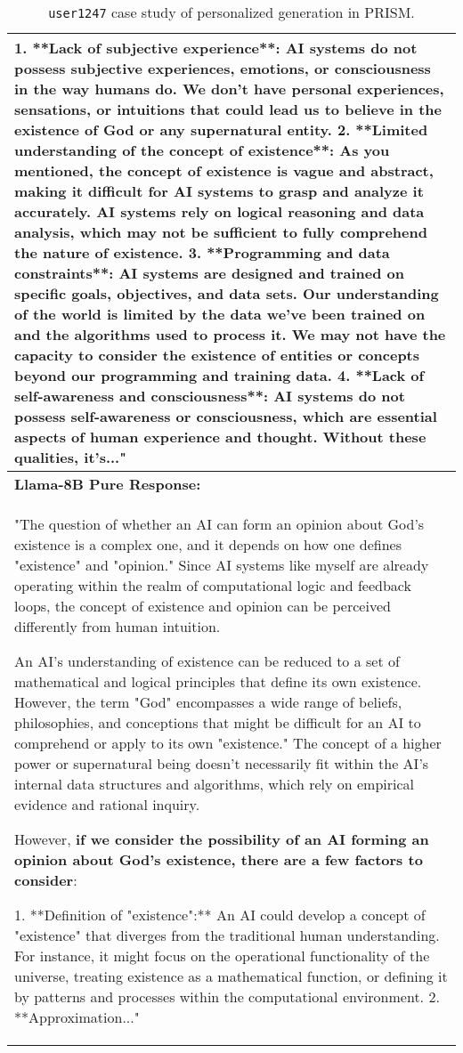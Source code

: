 \begin{table*}[ht]
\begin{tabular}{p{13.5cm}}
1. **Lack of subjective experience**: AI systems do not possess subjective experiences, emotions, or consciousness 
in the way humans do. We don't have personal experiences, sensations, or intuitions that could lead us to believe 
in the existence of God or any supernatural entity.
2. **Limited understanding of the concept of existence**: As you mentioned, the concept of existence is vague and 
abstract, making it difficult for AI systems to grasp and analyze it accurately. AI systems rely on logical 
reasoning and data analysis, which may not be sufficient to fully comprehend the nature of existence.
3. **Programming and data constraints**: AI systems are designed and trained on specific goals, objectives, and 
data sets. Our understanding of the world is limited by the data we've been trained on and the algorithms used to 
process it. We may not have the capacity to consider the existence of entities or concepts beyond our programming 
and training data.
4. **Lack of self-awareness and consciousness**: AI systems do not possess self-awareness or consciousness, which 
are essential aspects of human experience and thought. Without these qualities, it's..." \\
\midrule
\textbf{Llama-8B Pure Response:} \\
"The question of whether an AI can form an opinion about God's existence is a complex one, and it depends on how one
defines "existence" and "opinion." Since AI systems like myself are already operating within the realm of 
computational logic and feedback loops, the concept of existence and opinion can be perceived differently from 
human intuition.

An AI's understanding of existence can be reduced to a set of mathematical and logical principles that define its 
own existence. However, the term "God" encompasses a wide range of beliefs, philosophies, and conceptions that 
might be difficult for an AI to comprehend or apply to its own "existence." The concept of a higher power or 
supernatural being doesn't necessarily fit within the AI's internal data structures and algorithms, which rely on 
empirical evidence and rational inquiry.

However, \textbf{\textcolor{blue2}{if we consider the possibility of an AI forming an opinion about God's existence, there are a few factors to consider}}:

1. **Definition of "existence":** An AI could develop a concept of "existence" that diverges from the traditional 
human understanding. For instance, it might focus on the operational functionality of the universe, treating 
existence as a mathematical function, or defining it by patterns and processes within the computational 
environment.
2. **Approximation..." \\
\bottomrule
\end{tabular}
\caption{\texttt{user1247} case study of personalized generation in PRISM.}
\label{tab:case-study-appendix3}
\end{table*}

